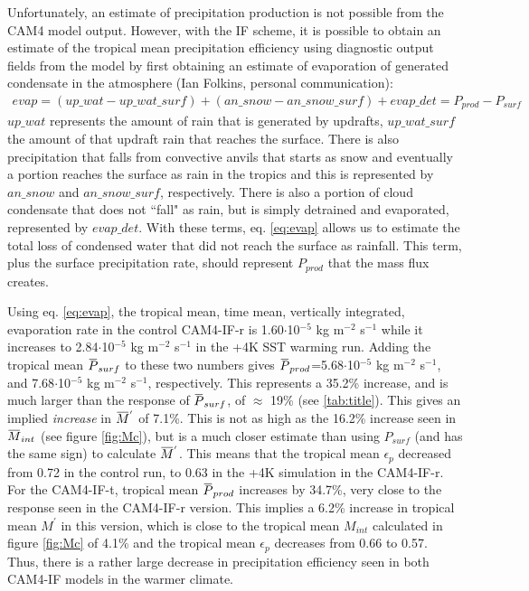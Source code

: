 \documentclass[letterpaper,12pt,titlepage,oneside,final]{book}
\newcommand{\overbar}[1]{\mkern 1.5mu\overline{\mkern-1.5mu#1\mkern-1.5mu}\mkern 1.5mu}
\begin{document}
Unfortunately, an estimate of precipitation production is not possible from the CAM4 model output. However, with the IF scheme, it is possible to obtain an estimate of the tropical mean precipitation efficiency using diagnostic output fields from the model by first obtaining an estimate of evaporation of generated condensate in the atmosphere (Ian Folkins, personal communication):
\begin{align}\label{eq:evap}
evap=(up\_wat - up\_wat\_surf)+(an\_snow - an\_snow\_surf)+evap\_det=P_{prod}-P_{surf}
\end{align}
$up\_wat$ represents the amount of rain that is generated by updrafts, $up\_wat\_surf$ the amount of that updraft rain that reaches the surface. There is also precipitation that falls from convective anvils that starts as snow and eventually a portion reaches the surface as rain in the tropics and this is represented by $an\_snow$ and $an\_snow\_surf$, respectively. There is also a portion of cloud condensate that does not ``fall" as rain, but is simply detrained and evaporated, represented by $evap\_det$. With these terms, eq. \ref{eq:evap} allows us to estimate the total loss of condensed water that did not reach the surface as rainfall. This term, plus the surface precipitation rate, should represent $P_{prod}$ that the mass flux creates. 

Using eq. \ref{eq:evap}, the tropical mean, time mean, vertically integrated, evaporation rate in the control CAM4-IF-r is 1.60$\cdot$10$^{-5}$ kg m$^{-2}$ s$^{-1}$ while it increases to 2.84$\cdot$10$^{-5}$ kg m$^{-2}$ s$^{-1}$ in the +4K SST warming run. Adding the tropical mean $\overbar{P}_{surf}$ to these two numbers gives $\overbar{P}_{prod}$=5.68$\cdot$10$^{-5}$ kg m$^{-2}$ s$^{-1}$, and 7.68$\cdot$10$^{-5}$ kg m$^{-2}$ s$^{-1}$, respectively. This represents a 35.2\% increase, and is much larger than the response of $\overbar{P}_{surf}$, of $\approx$ 19\% (see \ref{tab:title}). This gives an implied \textit{increase} in $\overbar{M}^{'}$ of 7.1\%. This is not as high as the  16.2\% increase seen in $\overbar{M}_{int}$ (see figure \ref{fig:Mc}), but is a much closer estimate than using $P_{surf}$ (and has the same sign) to calculate $\overbar{M}^{'}$. This means that the tropical mean $\epsilon_{p}$ decreased from 0.72 in the control run, to 0.63 in the +4K simulation in the CAM4-IF-r. For the CAM4-IF-t, tropical mean $\overbar{P}_{prod}$ increases by 34.7\%, very close to the response seen in the CAM4-IF-r version. This implies a 6.2\% increase in tropical mean $M^{'}$ in this version, which is close to the tropical mean $M_{int}$ calculated in figure \ref{fig:Mc} of 4.1\% and the tropical mean $\epsilon_{p}$ decreases from 0.66 to 0.57. Thus, there is a rather large decrease in precipitation efficiency seen in both CAM4-IF models in the warmer climate.
\end{document}

